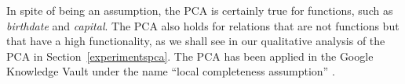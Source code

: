In spite of being an assumption, the PCA is certainly true for functions, such as \emph{birthdate} and \emph{capital}.
The PCA also holds for relations that are not functions but that have a high functionality,
as we shall see in our qualitative analysis of the PCA in Section~\ref{experimentspca}.
The PCA has been applied in the Google Knowledge Vault under the name ``local completeness assumption'' \cite{knowledgevault}.









%
